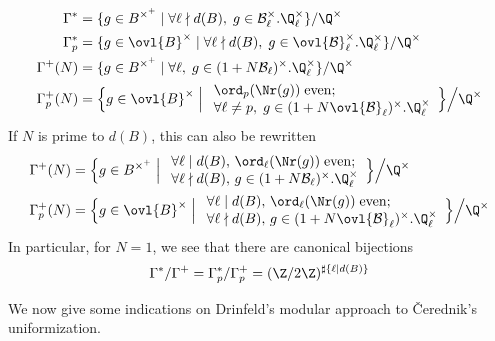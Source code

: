 \begin{para}
 \begin{align*}
  \Gamma^\ast&=\{g\in B^{\times^+}\mid \forall \ell
  \nmid d(B), \; g\in \mathcal{B}_\ell^\times.\Q_\ell^\times\}/\Q^\times\\
  \Gamma^\ast_p&=\{g\in \ovl{B}^\times\mid \forall
   \ell \nmid d(B), \; g\in
   \ovl{\mathcal{B}}_\ell^\times.\Q_\ell^\times\}/\Q^{\times}\\
  \Gamma^+(N)&= \{g\in B^{\times^+}\mid \forall \ell, \; g\in
   (1+N\mathcal{B}_\ell)^\times.\Q_\ell^{\times}\}/\Q^{\times}\\
  \Gamma^+_p(N)&= \Bigl\{g\in \ovl{B}^\times\Bigm|
   \begin{array}{l}
    \ord_p(\Nr(g))\;{\rm even};\\
    \forall \ell \neq p,\; g\in
    (1+N\ovl{\mathcal{B}}_{\ell})^\times.\Q_\ell^\times\\ 
   \end{array}
  \Bigr\}\Big/\Q^{\times}
 \end{align*}
 If $N$ is prime to $d(B)$, this can also be rewritten
 \begin{align*}
 \Gamma^+(N)&= \Bigl\{g\in B^{\times^+}\Bigm|
  \begin{array}{l}
   \forall\ell\mid d(B),\, \ord_\ell(\Nr(g))\;{\rm even};\\
   \forall\ell\nmid d(B),\, g\in (1+N\mathcal{B}_\ell)^\times.\Q_\ell^\times\\
  \end{array}
  \Bigr\}\Big/\Q^\times \\
  \Gamma^+_p(N)&= \Bigl\{g\in \ovl{B}^\times\Bigm|
  \begin{array}{l}
   \forall\ell\mid d(B),\, \ord_\ell(\Nr(g))\;{\rm even};\\
   \forall\ell\nmid d(B),\,
    g\in (1+N\ovl{\mathcal{B}}_{\ell})^{\times}.\Q_{\ell}^{\times}\\
  \end{array}
  \Bigr\}\Big/\Q^{\times}
 \end{align*}
 In particular, for $N=1$, we see that there are canonical bijections 
 \begin{equation*}
 \Gamma^{\ast}/\Gamma^+=\Gamma^{\ast}_p/\Gamma^+_p =
  (\Z/2\Z)^{\sharp\{\ell| d(B)\}}
 \end{equation*} 
\end{para}

\begin{para}\label{para:7.4.5} We now give some indications on Drinfeld's
 modular approach to \v{C}erednik's uniformization.  
\end{para}

